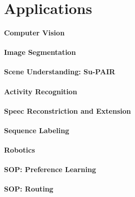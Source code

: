 	\section{Applications} %

		\paragraph{Computer Vision} %

		\paragraph{Image Segmentation} %

		\paragraph{Scene Understanding: Su-PAIR} %

		\paragraph{Activity Recognition} %

		\paragraph{Speec Reconstriction and Extension} %

		\paragraph{Sequence Labeling} %

		\paragraph{Robotics} %

		\paragraph{SOP: Preference Learning} %

		\paragraph{SOP: Routing} %

